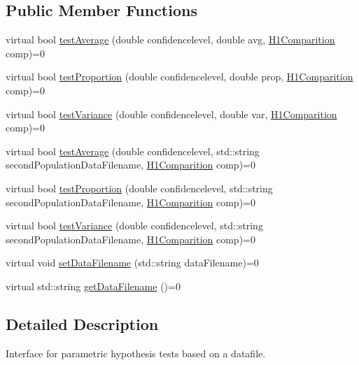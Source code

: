 \subsection*{Public Member Functions}
\begin{DoxyCompactItemize}
\item 
virtual bool \hyperlink{class_hypothesis_tester__if_a00a01e530acaf3f4db644b439c1c162e}{test\+Average} (double confidencelevel, double avg, \hyperlink{class_hypothesis_tester__if_a89153ff990252f9f79856a2f2532c349}{H1\+Comparition} comp)=0
\item 
virtual bool \hyperlink{class_hypothesis_tester__if_a9a07fdf3648371e4595acb3599f7b03b}{test\+Proportion} (double confidencelevel, double prop, \hyperlink{class_hypothesis_tester__if_a89153ff990252f9f79856a2f2532c349}{H1\+Comparition} comp)=0
\item 
virtual bool \hyperlink{class_hypothesis_tester__if_a1734abfa4bd0c3e8fc67c96172aca728}{test\+Variance} (double confidencelevel, double var, \hyperlink{class_hypothesis_tester__if_a89153ff990252f9f79856a2f2532c349}{H1\+Comparition} comp)=0
\item 
virtual bool \hyperlink{class_hypothesis_tester__if_a0c0314bc8ff8bef239583f2c8af4ed56}{test\+Average} (double confidencelevel, std\+::string second\+Population\+Data\+Filename, \hyperlink{class_hypothesis_tester__if_a89153ff990252f9f79856a2f2532c349}{H1\+Comparition} comp)=0
\item 
virtual bool \hyperlink{class_hypothesis_tester__if_a10b193007a3fde816120b32903241336}{test\+Proportion} (double confidencelevel, std\+::string second\+Population\+Data\+Filename, \hyperlink{class_hypothesis_tester__if_a89153ff990252f9f79856a2f2532c349}{H1\+Comparition} comp)=0
\item 
virtual bool \hyperlink{class_hypothesis_tester__if_ad2360392ccf3858da38092448152c33d}{test\+Variance} (double confidencelevel, std\+::string second\+Population\+Data\+Filename, \hyperlink{class_hypothesis_tester__if_a89153ff990252f9f79856a2f2532c349}{H1\+Comparition} comp)=0
\item 
virtual void \hyperlink{class_hypothesis_tester__if_ae7cfc801a3c0206844e3bc73e0b4234a}{set\+Data\+Filename} (std\+::string data\+Filename)=0
\item 
virtual std\+::string \hyperlink{class_hypothesis_tester__if_a37b02ea209d8f6b566af9e2fff6511cc}{get\+Data\+Filename} ()=0
\end{DoxyCompactItemize}


\subsection{Detailed Description}
Interface for parametric hypothesis tests based on a datafile. 

